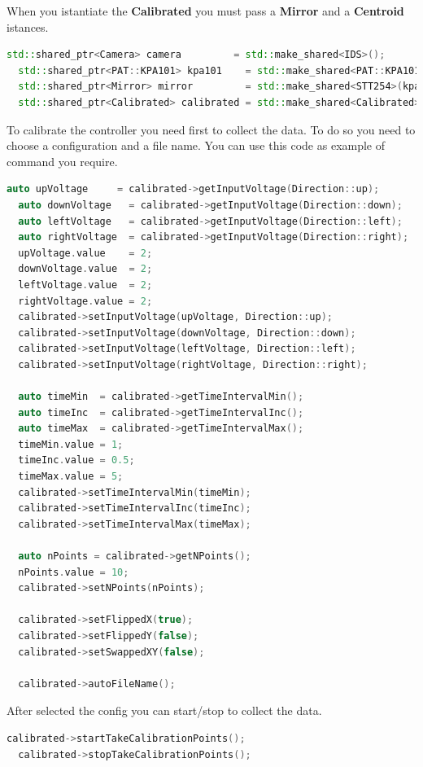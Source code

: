 When you istantiate the \textbf{Calibrated} you must pass a
\textbf{Mirror} and a \textbf{Centroid} istances.

\begin{lstlisting}[language=c++, gobble=2]
  std::shared_ptr<Camera> camera         = std::make_shared<IDS>();
  std::shared_ptr<PAT::KPA101> kpa101    = std::make_shared<PAT::KPA101>();
  std::shared_ptr<Mirror> mirror         = std::make_shared<STT254>(kpa101);
  std::shared_ptr<Calibrated> calibrated = std::make_shared<Calibrated>(mirror, camera->getFrame()->getCentroid(), camera->getFrame()->getTarget());
\end{lstlisting}

To calibrate the controller you need first to collect the data. To do so
you need to choose a configuration and a file name. You can use this
code as example of command you require.

\begin{lstlisting}[language=c++, gobble=2]
  auto upVoltage     = calibrated->getInputVoltage(Direction::up);
  auto downVoltage   = calibrated->getInputVoltage(Direction::down);
  auto leftVoltage   = calibrated->getInputVoltage(Direction::left);
  auto rightVoltage  = calibrated->getInputVoltage(Direction::right);
  upVoltage.value    = 2;
  downVoltage.value  = 2;
  leftVoltage.value  = 2;
  rightVoltage.value = 2;
  calibrated->setInputVoltage(upVoltage, Direction::up);
  calibrated->setInputVoltage(downVoltage, Direction::down);
  calibrated->setInputVoltage(leftVoltage, Direction::left);
  calibrated->setInputVoltage(rightVoltage, Direction::right);
  
  auto timeMin  = calibrated->getTimeIntervalMin();
  auto timeInc  = calibrated->getTimeIntervalInc();
  auto timeMax  = calibrated->getTimeIntervalMax();
  timeMin.value = 1;
  timeInc.value = 0.5;
  timeMax.value = 5;
  calibrated->setTimeIntervalMin(timeMin);
  calibrated->setTimeIntervalInc(timeInc);
  calibrated->setTimeIntervalMax(timeMax);
  
  auto nPoints = calibrated->getNPoints();
  nPoints.value = 10;
  calibrated->setNPoints(nPoints);
  
  calibrated->setFlippedX(true);
  calibrated->setFlippedY(false);
  calibrated->setSwappedXY(false);
  
  calibrated->autoFileName();
\end{lstlisting}

After selected the config you can start/stop to collect the data.

\begin{lstlisting}[language=c++, gobble=2]
  calibrated->startTakeCalibrationPoints();
  calibrated->stopTakeCalibrationPoints();
\end{lstlisting}

